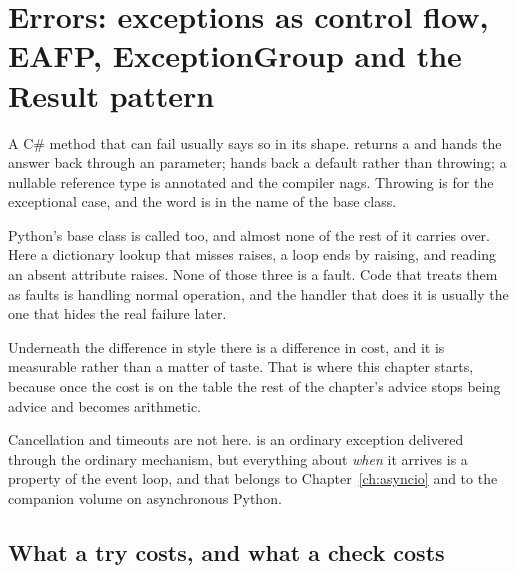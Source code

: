 
\chapter{Errors: exceptions as control flow, EAFP, ExceptionGroup and the Result pattern}
\label{ch:errors}

\noindent
A C\# method that can fail usually says so in its shape. 
returns a  and hands the answer back through an 
parameter;  hands back a default rather than throwing; a
nullable reference type is annotated and the compiler nags. Throwing is for the exceptional
case, and the word is in the name of the base class.

Python's base class is called  too, and almost none of the
rest of it carries over. Here a dictionary lookup that misses raises, a
 loop ends by raising, and reading an absent attribute raises.
None of those three is a fault. Code that treats them as faults is handling
normal operation, and the handler that does it is usually the one that hides
the real failure later.

Underneath the difference in style there is a difference in cost, and it is
measurable rather than a matter of taste. That is where this chapter starts,
because once the cost is on the table the rest of the chapter's advice stops
being advice and becomes arithmetic.

\begin{note}
Cancellation and timeouts are not here.  is an ordinary
exception delivered through the ordinary mechanism, but everything about
\emph{when} it arrives is a property of the event loop, and that belongs to
Chapter~\ref{ch:asyncio} and to the companion volume on asynchronous Python.
\end{note}

\section{What a try costs, and what a check costs}
\label{sec:ch06-cost}

